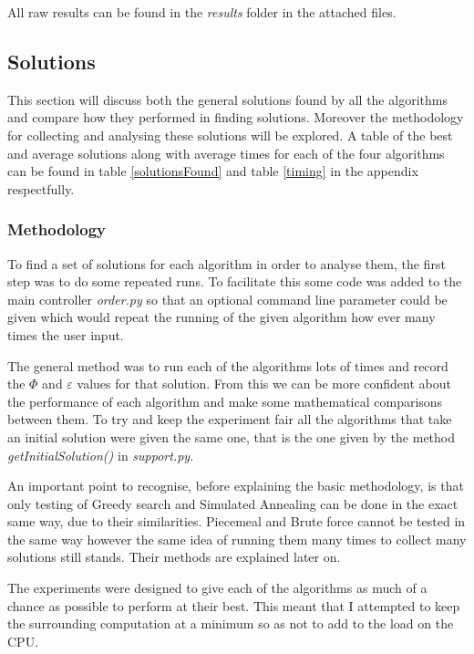 \documentclass[12pt]{report}
\begin{document}
All raw results can be found in the \textit{results} folder in the attached files.

\subsection{Solutions}\label{solutions}
This section will discuss both the general solutions found by all the algorithms and compare how they performed in finding solutions. Moreover the methodology for collecting and analysing these solutions will be explored. A table of the best and average solutions along with average times for each of the four algorithms can be found in table \ref{solutionsFound} and table \ref{timing} in the appendix respectfully. 

\subsubsection{Methodology}
To find a set of solutions for each algorithm in order to analyse them, the first step was to do some repeated runs. To facilitate this some code was added to the main controller \textit{order.py} so that an optional command line parameter could be given which would repeat the running of the given algorithm how ever many times the user input. 

The general method was to run each of the algorithms lots of times and record the $\Phi$ and $\varepsilon$ values for that solution. From this we can be more confident about the performance of each algorithm and make some mathematical comparisons between them. To try and keep the experiment fair all the algorithms that take an initial solution were given the same one, that is the one given by the method \textit{getInitialSolution()} in \textit{support.py}.

An important point to recognise, before explaining the basic methodology, is that only testing of Greedy search and Simulated Annealing can be done in the exact same way, due to their similarities. Piecemeal and Brute force cannot be tested in the same way however the same idea of running them many times to collect many solutions still stands. Their methods are explained later on.

The experiments were designed to give each of the algorithms as much of a chance as possible to perform at their best. This meant that I attempted to keep the surrounding computation at a minimum so as not to add to the load on the CPU.
\end{document}
